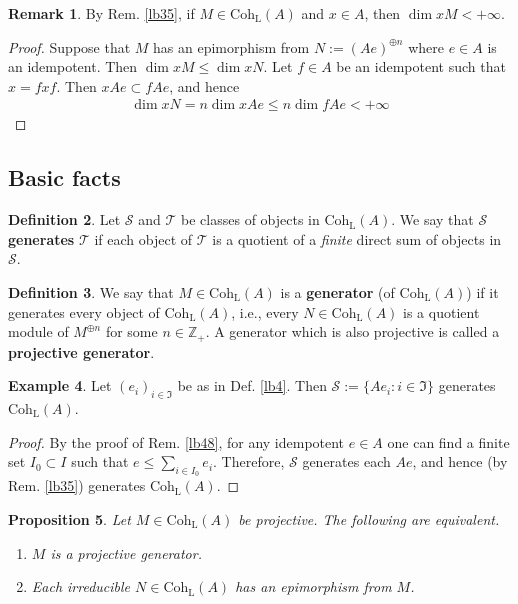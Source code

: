 \documentclass[11pt,b5paper,notitlepage]{article}
\theoremstyle{definition}
\newtheorem{df}{Definition}[section]
\newtheorem{eg}[df]{Example}
\newtheorem{rem}[df]{Remark}
\theoremstyle{plain}
\newtheorem{pp}[df]{Proposition}
\newcommand{\fk}{\mathfrak}
\newcommand{\scr}{\mathscr}
\newcommand{\Zbb}{\mathbb Z}
\newcommand{\Coh}{\mathrm{Coh}_{\mathrm L}}
\numberwithin{equation}{section}
\begin{document}
\begin{rem}\label{lb56}
By Rem. \ref{lb35}, if $M\in\Coh(A)$ and $x\in A$, then $\dim xM<+\infty$.
\end{rem}

\begin{proof}
Suppose that $M$ has an epimorphism from $N:=(Ae)^{\oplus n}$ where $e\in A$ is an idempotent. Then $\dim xM\leq \dim xN$. Let $f\in A$ be an idempotent such that $x=fxf$. Then $xAe\subset fAe$, and hence
\begin{align*}
\dim xN=n\dim xAe\leq n\dim fAe<+\infty
\end{align*} 
\end{proof}



\subsection{Basic facts}

\begin{df}
Let $\scr S$ and $\scr T$ be classes of objects in $\Coh(A)$. We say that $\scr S$ \textbf{generates} $\scr T$ if each object of $\scr T$ is a quotient of a \textit{finite} direct sum of objects in $\scr S$.
\end{df}


\begin{df}
We say that $M\in\Coh(A)$ is a \textbf{generator} (of $\Coh(A)$) if it generates every object of $\Coh(A)$, i.e., every $N\in\Coh(A)$ is a quotient module of $M^{\oplus n}$ for some $n\in\Zbb_+$. A generator which is also projective is called a \textbf{projective generator}.
\end{df}


\begin{eg}\label{lb34}
Let $(e_i)_{i\in\fk I}$ be as in Def. \ref{lb4}. Then $\scr S:=\{Ae_i:i\in\fk I\}$ generates $\Coh(A)$.
\end{eg}

\begin{proof}
By the proof of Rem. \ref{lb48}, for any idempotent $e\in A$ one can find a finite set $I_0\subset I$ such that $e\leq\sum_{i\in I_0} e_i$. Therefore, $\scr S$ generates each $Ae$, and hence (by Rem. \ref{lb35}) generates $\Coh(A)$.
\end{proof}


\begin{pp}\label{lb27}
Let $M\in\Coh(A)$ be projective. The following are equivalent.
\begin{enumerate}[label=(\arabic*)]
\item $M$ is a projective generator.
\item Each irreducible $N\in\Coh(A)$ has an epimorphism from $M$.
\end{enumerate}
\end{pp}
\end{document}
